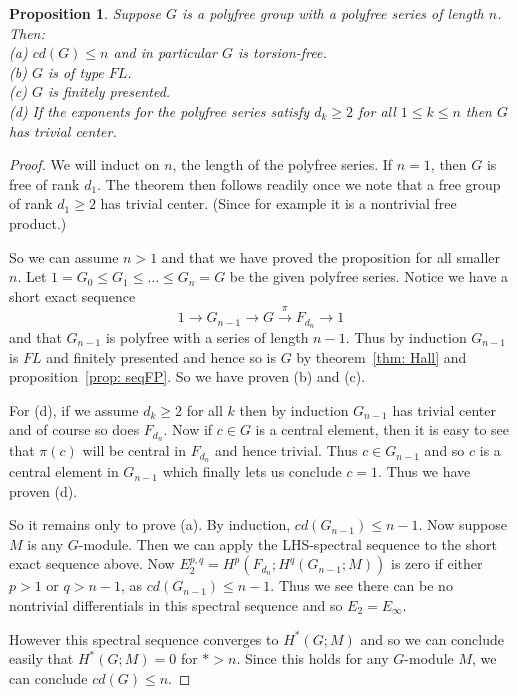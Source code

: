 \documentclass{amsart}
\newtheorem{prop}[thm]{Proposition}
\begin{document}
\begin{prop}
\label{prop: baspoly}
Suppose $G$ is a polyfree group with a polyfree series of length $n$.
Then: \\
(a) $cd(G) \leq n$ and in particular $G$ is torsion-free. \\
(b) $G$ is of type $FL$. \\
(c) $G$ is finitely presented. \\
(d) If the exponents for the polyfree series satisfy $d_k \geq 2$ for
all $1 \leq k \leq n$ then $G$ has trivial center.
\end{prop} 
\begin{proof}
We will induct on $n$, the length of the polyfree series. If $n=1$, then
$G$ is free of rank $d_1$. The theorem then follows readily once we note
that a free group of rank $d_1 \geq 2$ has trivial center. (Since for
example it is a nontrivial free product.)

So we can assume $n>1$ and that we have proved the proposition for all smaller
$n$. Let $1=G_0 \le G_1 \le \dots \le G_n=G$ be the given polyfree series.
Notice we have a short exact sequence
$$
1 \rightarrow G_{n-1} \rightarrow G \overset{\pi}{\rightarrow} 
F_{d_n} \rightarrow 1
$$
and that $G_{n-1}$ is polyfree with a series of length $n-1$.
Thus by induction $G_{n-1}$ is $FL$ and finitely presented and hence
so is $G$ by theorem~\ref{thm: Hall} and proposition~\ref{prop: seqFP}.
So we have proven (b) and (c). 

For (d), if we assume $d_k \geq 2$ for all
$k$ then by induction $G_{n-1}$ has trivial center and of course so
does $F_{d_n}$. Now if $c \in G$ is a central element, then it is easy
to see that $\pi(c)$ will be central in $F_{d_n}$ and hence trivial.
Thus $c \in G_{n-1}$ and so $c$ is a central element in $G_{n-1}$ which
finally lets us conclude $c=1$. Thus we have proven (d).

So it remains only to prove (a). By induction, $cd(G_{n-1}) \leq n-1$.
Now suppose $M$ is any $G$-module. Then we can apply the LHS-spectral
sequence to the short exact sequence above. 
Now $E_2^{p,q} = H^p(F_{d_n};H^q(G_{n-1};M))$ is zero if either $p > 1$
or $q >n-1$, as $cd(G_{n-1}) \leq n-1$. Thus we see there can be
no nontrivial differentials in this spectral sequence and so $E_2=E_\infty$.

However this spectral sequence converges to $H^*(G;M)$ and so we can conclude
easily that $H^*(G;M)=0$ for $* > n$. Since this holds for any $G$-module
$M$, we can conclude $cd(G) \leq n$.
\end{proof}
\end{document}
